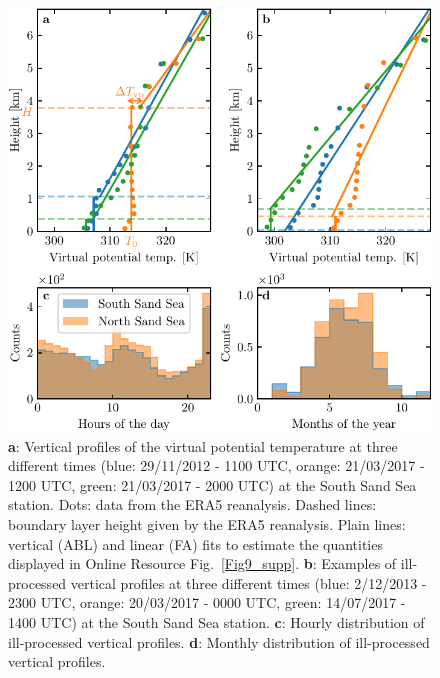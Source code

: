 \begin{figure}[p]
\centering
\includegraphics[scale=1]{Figures/Figure8_supp.pdf}
\caption{\textbf{a}: Vertical profiles of the virtual potential temperature at three different times (blue: 29/11/2012 - 1100 UTC, orange: 21/03/2017 - 1200 UTC, green: 21/03/2017 - 2000 UTC) at the South Sand Sea station. Dots: data from the ERA5 reanalysis. Dashed lines: boundary layer height given by the ERA5 reanalysis. Plain lines: vertical (ABL) and linear (FA) fits to estimate the quantities displayed in Online Resource Fig.~\ref{Fig9_supp}. \textbf{b}: Examples of ill-processed vertical profiles at three different times (blue: 2/12/2013 - 2300 UTC, orange: 20/03/2017 - 0000 UTC, green: 14/07/2017 - 1400 UTC) at the South Sand Sea station. \textbf{c}: Hourly distribution of ill-processed vertical profiles. \textbf{d}: Monthly distribution of ill-processed vertical profiles.}
\label{Fig8_supp}
\end{figure}

